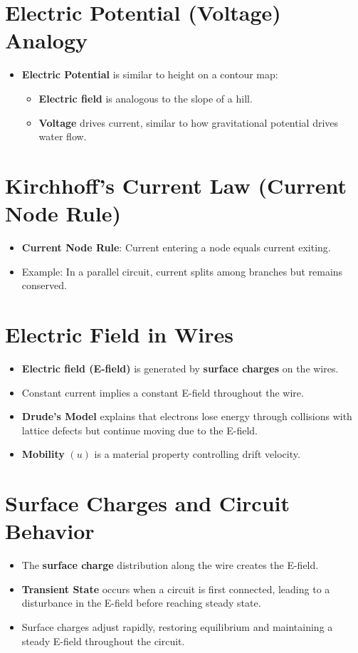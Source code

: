 \documentclass{article}
\begin{document}
\section*{Electric Potential (Voltage) Analogy}
\begin{itemize}
    \item \textbf{Electric Potential} is similar to height on a contour map:
    \begin{itemize}
        \item \textbf{Electric field} is analogous to the slope of a hill.
        \item \textbf{Voltage} drives current, similar to how gravitational potential drives water flow.
    \end{itemize}
\end{itemize}

\section*{Kirchhoff’s Current Law (Current Node Rule)}
\begin{itemize}
    \item \textbf{Current Node Rule}: Current entering a node equals current exiting.
    \item Example: In a parallel circuit, current splits among branches but remains conserved.
\end{itemize}

\section*{Electric Field in Wires}
\begin{itemize}
    \item \textbf{Electric field (E-field)} is generated by \textbf{surface charges} on the wires.
    \item Constant current implies a constant E-field throughout the wire.
    \item \textbf{Drude’s Model} explains that electrons lose energy through collisions with lattice defects but continue moving due to the E-field.
    \item \textbf{Mobility} \( (u) \) is a material property controlling drift velocity.
\end{itemize}

\section*{Surface Charges and Circuit Behavior}
\begin{itemize}
    \item The \textbf{surface charge} distribution along the wire creates the E-field.
    \item \textbf{Transient State} occurs when a circuit is first connected, leading to a disturbance in the E-field before reaching steady state.
    \item Surface charges adjust rapidly, restoring equilibrium and maintaining a steady E-field throughout the circuit.
\end{itemize}
\end{document}
